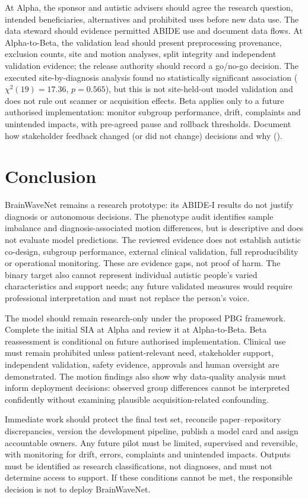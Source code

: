 \documentclass[11pt,a4paper]{article}
\begin{document}
At Alpha, the sponsor and autistic advisers should agree the research question, intended beneficiaries, alternatives and prohibited uses before new data use. The data steward should evidence permitted ABIDE use and document data flows. At Alpha-to-Beta, the validation lead should present preprocessing provenance, exclusion counts, site and motion analyses, split integrity and independent validation evidence; the release authority should record a go/no-go decision. The executed site-by-diagnosis analysis found no statistically significant association ($\chi^2(19)=17.36$, $p=0.565$), but this is not site-held-out model validation and does not rule out scanner or acquisition effects. Beta applies only to a future authorised implementation: monitor subgroup performance, drift, complaints and unintended impacts, with pre-agreed pause and rollback thresholds. Document how stakeholder feedback changed (or did not change) decisions and why (\cite{leslie2019}).

\section{Conclusion}
BrainWaveNet remains a research prototype: its ABIDE-I results do not justify diagnosis or autonomous decisions. The phenotype audit identifies sample imbalance and diagnosis-associated motion differences, but is descriptive and does not evaluate model predictions. The reviewed evidence does not establish autistic co-design, subgroup performance, external clinical validation, full reproducibility or operational monitoring. These are evidence gaps, not proof of harm. The binary target also cannot represent individual autistic people's varied characteristics and support needs; any future validated measures would require professional interpretation and must not replace the person's voice.

The model should remain research-only under the proposed PBG framework. Complete the initial SIA at Alpha and review it at Alpha-to-Beta. Beta reassessment is conditional on future authorised implementation. Clinical use must remain prohibited unless patient-relevant need, stakeholder support, independent validation, safety evidence, approvals and human oversight are demonstrated. The motion findings also show why data-quality analysis must inform deployment decisions: observed group differences cannot be interpreted confidently without examining plausible acquisition-related confounding.

Immediate work should protect the final test set, reconcile paper--repository discrepancies, version the development pipeline, publish a model card and assign accountable owners. Any future pilot must be limited, supervised and reversible, with monitoring for drift, errors, complaints and unintended impacts. Outputs must be identified as research classifications, not diagnoses, and must not determine access to support. If these conditions cannot be met, the responsible decision is not to deploy BrainWaveNet.

\printbibliography[heading=bibintoc,title={References}]

\end{document}
